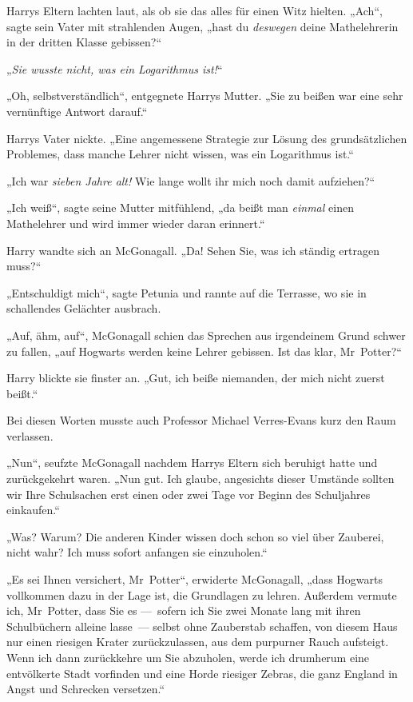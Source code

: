 {Harrys Eltern lachten laut, als ob sie das alles für einen Witz hielten. „Ach“, sagte sein Vater mit strahlenden Augen, „hast du \emph{deswegen} deine Mathelehrerin in der dritten Klasse gebissen?“

„\emph{Sie wusste nicht, was ein Logarithmus ist!}“

„Oh, selbstverständlich“, entgegnete Harrys Mutter. „Sie zu beißen war eine sehr vernünftige Antwort darauf.“

Harrys Vater nickte. „Eine angemessene Strategie zur Lösung des grundsätzlichen Problemes, dass manche Lehrer nicht wissen, was ein Logarithmus ist.“

„Ich war \emph{sieben Jahre alt!} Wie lange wollt ihr mich noch damit aufziehen?“

„Ich weiß“, sagte seine Mutter mitfühlend, „da beißt man \emph{einmal} einen Mathelehrer und wird immer wieder daran erinnert.“

Harry wandte sich an McGonagall. „Da! Sehen Sie, was ich ständig ertragen muss?“

„Entschuldigt mich“, sagte Petunia und rannte auf die Terrasse, wo sie in schallendes Gelächter ausbrach.

„Auf, ähm, auf“, McGonagall schien das Sprechen aus irgendeinem Grund schwer zu fallen, „auf Hogwarts werden keine Lehrer gebissen. Ist das klar, Mr~Potter?“

Harry blickte sie finster an. „Gut, ich beiße niemanden, der mich nicht zuerst beißt.“

Bei diesen Worten musste auch Professor Michael Verres-Evans kurz den Raum verlassen.

„Nun“, seufzte McGonagall nachdem Harrys Eltern sich beruhigt hatte und zurückgekehrt waren. „Nun gut. Ich glaube, angesichts dieser Umstände sollten wir Ihre Schulsachen erst einen oder zwei Tage vor Beginn des Schuljahres einkaufen.“

„Was? Warum? Die anderen Kinder wissen doch schon so viel über Zauberei, nicht wahr? Ich muss sofort anfangen sie einzuholen.“

„Es sei Ihnen versichert, Mr~Potter“, erwiderte McGonagall, „dass Hogwarts vollkommen dazu in der Lage ist, die Grundlagen zu lehren. Außerdem vermute ich, Mr~Potter, dass Sie es —~sofern ich Sie zwei Monate lang mit ihren Schulbüchern alleine lasse~— selbst ohne Zauberstab schaffen, von diesem Haus nur einen riesigen Krater zurückzulassen, aus dem purpurner Rauch aufsteigt. Wenn ich dann zurückkehre um Sie abzuholen, werde ich drumherum eine entvölkerte Stadt vorfinden und eine Horde riesiger Zebras, die ganz England in Angst und Schrecken versetzen.“

}
